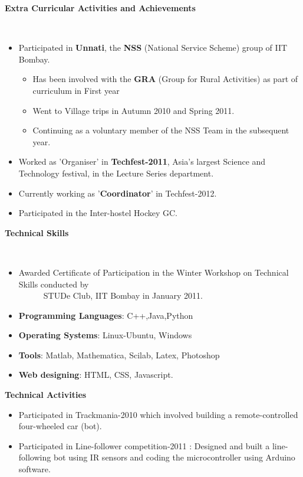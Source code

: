 \documentclass[a4paper,11pt]{article}
\newcommand{\lsep}{-0.5cm}
\newcommand{\resheading}[1]{{\small \colorbox{mygrey}{\begin{minipage}{0.975\textwidth}{\textbf{#1 \vphantom{p\^{E}}}}\end{minipage}}}}
\begin{document}
\resheading{\textbf{\large Extra Curricular Activities and Achievements}}\\[\lsep]
\begin{itemize}
  \item Participated in \textbf{Unnati}, the \textbf{NSS} (National Service Scheme) group of IIT Bombay.
	\begin{itemize}
	 \item Has been involved with the \textbf{GRA} (Group for Rural Activities) as part of curriculum in First year\\[-0.6cm]
	 \item Went to Village trips in Autumn 2010 and Spring 2011.
	 \item Continuing as a voluntary member of the NSS Team in the subsequent year.
	  \end{itemize}
  \item Worked as 'Organiser' in \textbf{Techfest-2011}, Asia's largest Science and Technology festival, in the Lecture Series department. \\[-0.6cm]
  \item Currently working as '\textbf{Coordinator}' in Techfest-2012.
  \item Participated in the Inter-hostel Hockey GC. 
\end{itemize}

\resheading{\textbf{\large Technical Skills}}\\[\lsep]
\begin{itemize}
  \item Awarded Certificate of Participation in the Winter Workshop on Technical Skills conducted by \\ \ \  \ \ \ \  STUDe Club, IIT Bombay in January 2011. \\[-0.6cm]
  \item \textbf{Programming Languages}: C++,Java,Python\\[-0.6cm]
  \item \textbf{Operating Systems}: Linux-Ubuntu, Windows\\[-0.6cm]
  \item \textbf{Tools}: Matlab, Mathematica, Scilab, Latex, Photoshop\\[-0.6cm]
  \item \textbf{Web designing}: HTML, CSS, Javascript.
\end{itemize}

\resheading{\textbf{\large Technical Activities}}
\begin{itemize}
 \item Participated in Trackmania-2010 which involved building a remote-controlled four-wheeled car (bot). \\[-0.7cm]
 	
 \item Participated in Line-follower competition-2011 : Designed and built a line-following bot using IR sensors and coding the microcontroller using Arduino software.
\end{itemize}
\end{document}
